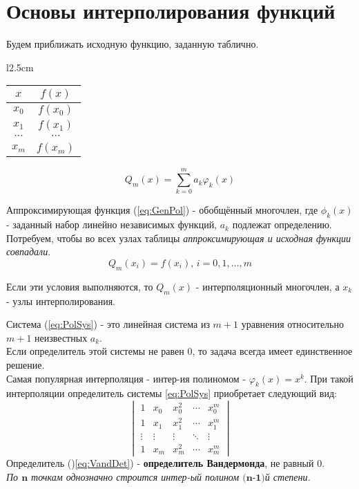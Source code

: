 \documentclass[a4paper,11pt]{article}
\begin{document}
\section{Основы интерполирования функций}
\begin{minipage}{1\linewidth}
  Будем приближать исходную функцию, заданную таблично.
  \begin{wraptable}{l}{2.5cm}
    \begin{tabular}{ c|c }
      $x$ & $f(x)$ \\
      \hline
      $x_0$ & $f(x_0)$ \\
      $x_1$ & $f(x_1)$ \\
      $\cdots$ & $\cdots$ \\
      $x_m$ & $f(x_m)$
    \end{tabular}
  \end{wraptable}
  \begin{equation}
    Q_m(x) = \sum_{k=0}^{m} a_k \varphi_k(x)
    \label{eq:GenPol}
  \end{equation}

  Аппроксимирующая функция (\ref{eq:GenPol}) - обобщённый многочлен, где ${\phi_k(x)}$ - заданный набор линейно независимых функций, $a_k$ подлежат определению. \\

  Потребуем, чтобы во всех узлах таблицы \textit{аппроксимирующая и исходная функции совпадали}.
  \begin{equation}
    Q_m(x_i) = f(x_i), \, i = 0, 1, \dots, m
    \label{eq:PolSys}
  \end{equation}
  \begin{center}
    Если эти условия выполняются, то $Q_m(x)$ - интерполяционный многочлен, а $x_k$ - узлы интерполирования.
  \end{center}
\vspace{2mm}
\end{minipage}
\newline
Система (\ref{eq:PolSys}) - это линейная система из $m+1$ уравнения относительно $m+1$ неизвестных $a_k$. \\
Если определитель этой системы не равен $0$, то задача всегда имеет единственное решение. \\
\newline
Самая популярная интерполяция - интер-ия полиномом - \(\varphi_k(x) = x^k\).
При такой интерполяции определитель системы \ref{eq:PolSys} приобретает следующий вид:
\begin{equation}
  \begin{vmatrix}
    1 & x_0 & x_0^2 & \cdots & x_0^m \\
    1 & x_1 & x_1^2 & \cdots & x_1^m \\
    \vdots & \vdots & \vdots & \ddots & \vdots \\
    1 & x_m & x_m^2 & \cdots & x_m^m
  \end{vmatrix}
  \label{eq:VandDet}
\end{equation}
Определитель ()\ref{eq:VandDet}) - \textbf{определитель Вандермонда}, не равный $0$. \\

\textit{По $\textbf{n}$ точкам однозначно строится интер-ый полином $\textbf{(n-1)}$й степени.} \\
\end{document}
